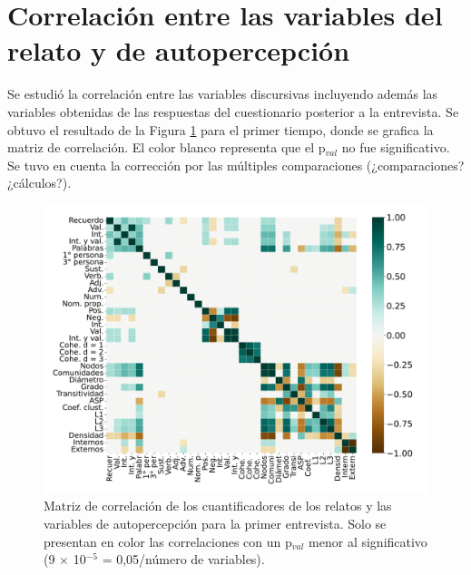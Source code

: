 \section{Correlación entre las variables del relato y de autopercepción}

Se estudió la correlación entre las variables discursivas incluyendo además las variables obtenidas de las respuestas del cuestionario posterior a la entrevista. Se obtuvo el resultado de la Figura \ref{fig:cap3_corr} para el primer tiempo, donde se grafica la matriz de correlación. El color blanco representa que el p$_{val}$ no fue significativo. Se tuvo en cuenta la corrección por las múltiples comparaciones (¿comparaciones? ¿cálculos?). 


\begin{figure}[h]
    \centering
    \includegraphics[width = 15cm]{figures/ch03/Correlacion/2correlacion_Primera.pdf} 
    \caption{Matriz de correlación de los cuantificadores de los relatos y las variables de autopercepción para la primer entrevista. Solo se presentan en color las correlaciones con un p$_{val}$ menor al significativo (9 $\times$ 10$^{-5}$ = 0,05/número de variables).}
\label{fig:cap3_corr}
\end{figure}

